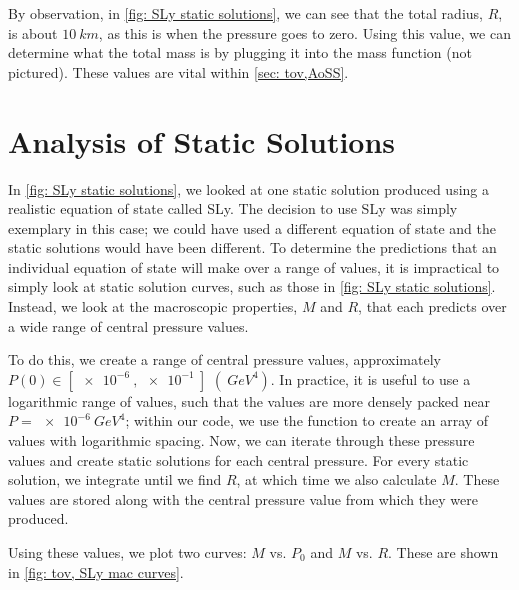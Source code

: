 By observation, in \autoref{fig: SLy static solutions}, we can see that the total radius, $R$, is about $\SI{10}{km}$, as this is when the pressure goes to zero. Using this value, we can determine what the total mass is by plugging it into the mass function (not pictured). These values are vital within \autoref{sec: tov,AoSS}.

\section{Analysis of Static Solutions}\label{sec: tov,AoSS}


In \autoref{fig: SLy static solutions}, we looked at one static solution produced using a realistic equation of state called SLy. The decision to use SLy was simply exemplary in this case; we could have used a different equation of state and the static solutions would have been different. To determine the predictions that an individual equation of state will make over a range of values, it is impractical to simply look at static solution curves, such as those in \autoref{fig: SLy static solutions}. Instead, we look at the macroscopic properties, $M$ and $R$, that each predicts over a wide range of central pressure values.

To do this, we create a range of central pressure values, approximately $P(0)\in [\SI{e-6}{}, \SI{e-1}{}]$ $(\SI{}{GeV^4})$. In practice, it is useful to use a logarithmic range of values, such that the values are more densely packed near $P=\SI{e-6}{GeV^4}$; within our code, we use the  function  to create an array of values with logarithmic spacing. Now, we can iterate through these pressure values and create static solutions for each central pressure. For every static solution, we integrate until we find $R$, at which time we also calculate $M$. These values are stored along with the central pressure value from which they were produced.

Using these values, we plot two curves: $M$ vs. $P_0$ and $M$ vs. $R$. These are shown in \autoref{fig: tov, SLy mac curves}.

